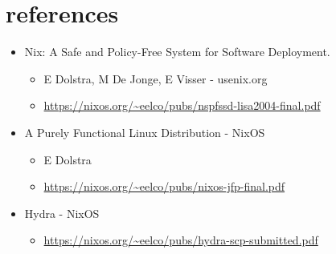 \documentclass[11pt]{article}
\begin{document}
\section{references}
\label{sec:org99d1ab5}
\begin{itemize}
\item\relax [HTML] Nix: A Safe and Policy-Free System for Software Deployment.
\begin{itemize}
\item E Dolstra, M De Jonge, E Visser - usenix.org
\item \url{https://nixos.org/\~eelco/pubs/nspfssd-lisa2004-final.pdf}
\end{itemize}
\item\relax [PDF] A Purely Functional Linux Distribution - NixOS
\begin{itemize}
\item E Dolstra
\item \url{https://nixos.org/\~eelco/pubs/nixos-jfp-final.pdf}
\end{itemize}
\item Hydra - NixOS
\begin{itemize}
\item \url{https://nixos.org/\~eelco/pubs/hydra-scp-submitted.pdf}
\end{itemize}
\end{itemize}
\end{document}
